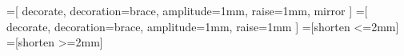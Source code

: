 =[
  decorate, decoration={brace, amplitude=1mm, raise=1mm, mirror}
]
=[
  decorate, decoration={brace, amplitude=1mm, raise=1mm}
]
=[shorten <=2mm]
=[shorten >=2mm]

\newcommand{\bracetobrace}[4] {
  \coordinate (a) at (#1);
  \coordinate (b) at (#2);
  \coordinate (c) at (#3);
  \coordinate (d) at (#4);
  \draw [bottombrace] (a) -- coordinate (e) (b);
  \draw [topbrace] (c) -- coordinate (f) (d);
  \draw [from brace, to brace, arrow] (e) -- (f);
}

\newcommand{\toppointer}[2] {
  \draw ([yshift=1mm] #1) [Latex-] -- ([yshift=1cm] #1) node [anchor=south] {#2};
}

